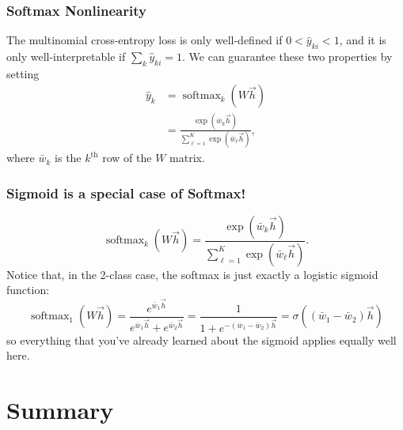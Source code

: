 \documentclass{beamer}
\DeclareMathOperator*{\softmax}{softmax}
\begin{document}
\begin{frame}
  \frametitle{Softmax Nonlinearity}

  The multinomial cross-entropy loss is only well-defined if
  $0<\hat{y}_{ki}<1$, and it is only well-interpretable if
  $\sum_k\hat{y}_{ki}=1$.  We can guarantee these two properties by
  setting
  \begin{align*}
    \hat{y}_k &= \softmax_k\left(W\vec{h}\right)\\
    &= \frac{\exp(\bar{w}_k\vec{h})}{\sum_{\ell=1}^K
      \exp(\bar{w}_\ell\vec{h})},
  \end{align*}
  where $\bar{w}_k$ is the $k^{\textrm{th}}$ row of the $W$ matrix.
\end{frame}

\begin{frame}
  \frametitle{Sigmoid is a special case of Softmax!}

  \begin{displaymath}
    \softmax_k\left(W\vec{h}\right)
    = \frac{\exp(\bar{w}_k\vec{h})}{\sum_{\ell=1}^K
      \exp(\bar{w}_\ell\vec{h})}.
  \end{displaymath}
  Notice that, in the 2-class case, the softmax is just exactly a
  logistic sigmoid function:
  \begin{displaymath}
    \softmax_1(W\vec{h}) = \frac{e^{\bar{w}_1\vec{h}}}{e^{\bar{w}_1\vec{h}}+e^{\bar{w}_2\vec{h}}}
    = \frac{1}{1+e^{-(\bar{w}_1-\bar{w}_2)\vec{h}}}  =\sigma\left((\bar{w}_1-\bar{w}_2)\vec{h}\right)
  \end{displaymath}
  so everything that you've already learned about the sigmoid applies
  equally well here.
\end{frame}

\section{Summary}
\setcounter{subsection}{1}
\end{document}
